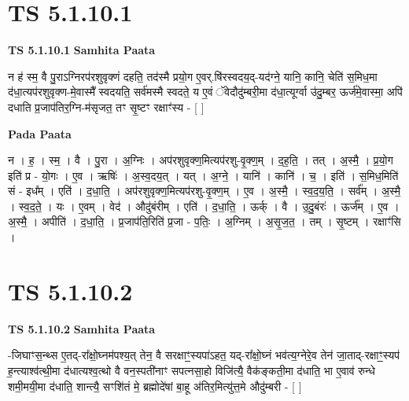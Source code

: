 \documentclass[17pt]{extarticle}
\begin{document}
\section*{ TS 5.1.10.1 }

\textbf{TS 5.1.10.1 } \newline
\textbf{Samhita Paata} \newline

न ह॑ स्म॒ वै पु॒राऽग्निरप॑रशुवृक्णं दहति॒ तद॑स्मै प्रयो॒ग ए॒वर्.षि॑रस्वदय॒द्-यद॑ग्ने॒ यानि॒ कानि॒ चेति॑ स॒मिध॒मा द॑धा॒त्यप॑रशुवृक्ण-मे॒वास्मै᳚ स्वदयति॒ सर्व॑मस्मै स्वदते॒ य ए॒वं ॅवेदौदु॑म्बरी॒मा द॑धा॒त्यूर्ग्वा उ॑दु॒म्बर॒ ऊर्ज॑मे॒वास्मा॒ अपि॑ दधाति प्र॒जाप॑तिर॒ग्नि-म॑सृजत॒ तꣳ सृ॒ष्टꣳ रक्षाꣳ॑स्य - [  ] \newline

\textbf{Pada Paata} \newline

न । ह॒ । स्म॒ । वै । पु॒रा । अ॒ग्निः । अप॑रशुवृक्ण॒मित्यप॑रशु-वृ॒क्ण॒म् । द॒ह॒ति॒ । तत् । अ॒स्मै॒ । प्र॒यो॒ग इति॑ प्र - यो॒गः । ए॒व । ऋषिः॑ । अ॒स्व॒दय॒त् । यत् । अ॒ग्ने॒ । यानि॑ । कानि॑ । च॒ । इति॑ । स॒मिध॒मिति॑ सं - इध᳚म् । एति॑ । द॒धा॒ति॒ । अप॑रशुवृक्ण॒मित्यप॑रशु-वृ॒क्ण॒म् । ए॒व । अ॒स्मै॒ । स्व॒द॒य॒ति॒ । सर्व᳚म् । अ॒स्मै॒ । स्व॒द॒ते॒ । यः । ए॒वम् । वेद॑ । औदु॑बंरीम् । एति॑ । द॒धा॒ति॒ । ऊर्क् । वै । उ॒दु॒बंरः॑ । ऊर्ज᳚म् । ए॒व । अ॒स्मै॒ । अपीति॑ । द॒धा॒ति॒ । प्र॒जाप॑ति॒रिति॑ प्र॒जा - प॒तिः॒ । अ॒ग्निम् । अ॒सृ॒ज॒त॒ । तम् । सृ॒ष्टम् । रक्षाꣳ॑सि ।  \newline




\section*{ TS 5.1.10.2 }

\textbf{TS 5.1.10.2 } \newline
\textbf{Samhita Paata} \newline

-जिघाꣳस॒न्थ्स ए॒तद्-रा᳚क्षो॒घ्नम॑पश्य॒त् तेन॒ वै सरक्षाꣳ॒॒स्यपा॑ऽहत॒ यद्-रा᳚क्षो॒घ्नं भव॑त्य॒ग्नेरे॒व तेन॑ जा॒ताद्-रक्षाꣳ॒॒स्यप॑ ह॒न्त्याश्व॑त्थी॒मा द॑धात्यश्व॒त्थो वै वन॒स्पती॑नाꣳ सपत्नसा॒हो विजि॑त्यै॒ वैक॑ङ्कती॒मा द॑धाति॒ भा ए॒वाव॑ रुन्धे शमी॒मयी॒मा द॑धाति॒ शान्त्यै॒ सꣳशि॑तं मे॒ ब्रह्मोदे॑षां बा॒हू अ॑तिर॒मित्यु॑त्त॒मे औदु॑म्बरी - [  ] \newline
\end{document}
